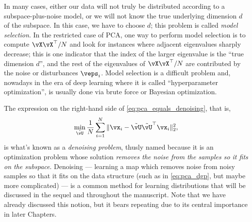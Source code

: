 \documentclass[\toplevelprefix/book-main.tex]{subfiles}
\begin{document}
\begin{remark}
    In many cases, either our data will not truly be distributed according to a subspace-plus-noise model, or we will not know the true underlying dimension \(d\) of the subspace. In this case, we have to choose \(d\); this problem is called \textit{model selection}. In the restricted case of PCA, one way to perform model selection is to compute \(\vX\vX^{\top}/N\) and look for instances where adjacent eigenvalues sharply decrease; this is one indicator that the index of the larger eigenvalue is the ``true dimension \(d\)'', and the rest of the eigenvalues of \(\vX\vX^{\top}/N\) are contributed by the noise or disturbances \(\veps_{i}\). Model selection is a difficult problem and, nowadays in the era of deep learning where it is called ``hyperparameter optimization'', is usually done via brute force or Bayesian optimization. %
\end{remark}

\begin{remark}
    The expression on the right-hand side of \eqref{eq:pca_equals_denoising}, that is,
    \begin{equation}\label{eq:orthogonal_denoising}
        \min_{\tilde{\vU}}\frac{1}{N}\sum_{i = 1}^{N}\norm{\vx_{i} - \tilde{\vU}\tilde{\vU}^{\top}\vx_{i}}_{2}^{2},
    \end{equation}
    is what's known as a \textit{denoising problem}, thusly named because it is an optimization problem whose solution \textit{removes the noise from the samples so it fits on the subspace}. Denoising --- learning a map which removes noise from noisy samples so that it fits on the data structure (such as in \eqref{eq:pca_dgp}, but maybe  more complicated) --- is a common method for learning distributions that will be discussed in the sequel and throughout the manuscript. Note that we have already discussed this notion, but it bears repeating due to its central importance in later Chapters.
\end{remark}
\end{document}
